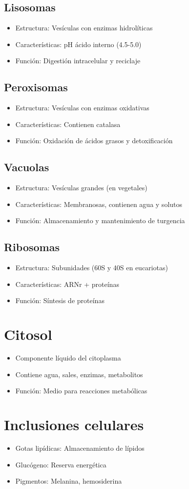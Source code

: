 \subsection{Lisosomas}
\begin{itemize}
    \item Estructura: Vesículas con enzimas hidrolíticas
    \item Características: pH ácido interno (4.5-5.0)
    \item Función: Digestión intracelular y reciclaje
\end{itemize}

\subsection{Peroxisomas}
\begin{itemize}
    \item Estructura: Vesículas con enzimas oxidativas
    \item Características: Contienen catalasa
    \item Función: Oxidación de ácidos grasos y detoxificación
\end{itemize}

\subsection{Vacuolas}
\begin{itemize}
    \item Estructura: Vesículas grandes (en vegetales)
    \item Características: Membranosas, contienen agua y solutos
    \item Función: Almacenamiento y mantenimiento de turgencia
\end{itemize}

\subsection{Ribosomas}
\begin{itemize}
    \item Estructura: Subunidades (60S y 40S en eucariotas)
    \item Características: ARNr + proteínas
    \item Función: Síntesis de proteínas
\end{itemize}

\section{Citosol}
\begin{itemize}
    \item Componente líquido del citoplasma
    \item Contiene agua, sales, enzimas, metabolitos
    \item Función: Medio para reacciones metabólicas
\end{itemize}

\section{Inclusiones celulares}
\begin{itemize}
    \item Gotas lipídicas: Almacenamiento de lípidos
    \item Glucógeno: Reserva energética
    \item Pigmentos: Melanina, hemosiderina
\end{itemize}
